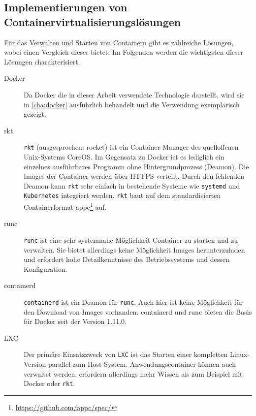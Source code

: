 
\subsection{Implementierungen von Containervirtualisierungslösungen}
\label{sec:container-solutions}
Für das Verwalten und Starten von Containern gibt es zahlreiche Lösungen, wobei \autocite{rkt-comparison:online} einen Vergleich dieser bietet.
Im Folgenden werden die wichtigsten dieser Lösungen charakterisiert.
\begin{description}
    \item [Docker] Da Docker die in dieser Arbeit verwendete Technologie darstellt, wird sie in \cref{cha:docker} ausführlich behandelt und die Verwendung exemplarisch gezeigt.
    \item [rkt] \texttt{rkt} (ausgesprochen: rocket) ist ein Container-Manager des quelloffenen Unix-Systems CoreOS. Im Gegensatz zu Docker ist es lediglich ein einzelnes ausführbares Programm ohne Hintergrundprozess (Deamon).
    Die Images der Container werden über HTTPS verteilt. Durch den fehlenden Deamon kann \texttt{rkt} sehr einfach in bestehende Systeme wie \texttt{systemd} und \texttt{Kubernetes} integriert werden. \texttt{rkt} baut auf dem standardisierten Containerformat appc\footnote{\url{https://github.com/appc/spec/}} auf.
    \item [runc] \texttt{runc} ist eine sehr systemnahe Möglichkeit Container zu starten und zu verwalten. Sie bietet allerdings keine Möglichkeit Images herunterzuladen und erfordert hohe Detailkenntnisse des Betriebssystems und dessen Konfiguration.
    \item [containerd] \texttt{containerd} ist ein Deamon für \texttt{runc}. Auch hier ist keine Möglichkeit für den Download von Images vorhanden. containerd und runc bieten die Basis für Docker seit der Version 1.11.0.
    \item [LXC] Der primäre Einsatzzweck von \texttt{LXC} ist das Starten einer kompletten Linux-Version parallel zum Host-System. Anwendungscontainer können auch verwaltet werden, erfordern allerdings mehr Wissen als zum Beispiel mit Docker oder \texttt{rkt}.
\end{description}

